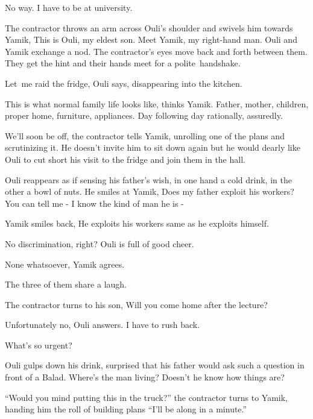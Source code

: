 \documentclass[letterpaper]{article}
\begin{document}
{\textquotedbl}No way. I have to be at university.{\textquotedbl} 

The contractor throws an arm across Ouli's shoulder and swivels him towards Yamik, {\textquotedbl}This is Ouli, my
eldest son. Meet Yamik, my right-hand man.{\textquotedbl} Ouli and Yamik exchange a nod. The contractor's eyes move
back and forth between them. They get the hint and their hands meet for a polite~handshake. 

{\textquotedbl}Let~me raid the fridge,{\textquotedbl} Ouli says, disappearing into the kitchen. 

This is what normal family life looks like, thinks Yamik. Father, mother, children, proper home, furniture, appliances.
Day following day rationally, assuredly.

{\textquotedbl}We'll soon be off,{\textquotedbl} the contractor tells Yamik, unrolling one of the plans and scrutinizing
it. He doesn't invite him to sit down again but he would dearly like Ouli to cut short his visit to the fridge and join
them in the hall.

Ouli reappears as if sensing his father's wish, in one hand a cold drink, in the other a bowl of nuts. He smiles at
Yamik, {\textquotedbl}Does my father exploit his workers? You can tell me - I know the kind of man he is
-{\textquotedbl} 

Yamik smiles back, {\textquotedbl}He exploits his workers same as he exploits himself.{\textquotedbl} 

{\textquotedbl}No discrimination, right?{\textquotedbl} Ouli is full of good cheer.

{\textquotedbl}None whatsoever,{\textquotedbl} Yamik agrees. 

The three of them share a laugh. 

The contractor turns to his son, {\textquotedbl}Will you come home after the lecture?{\textquotedbl} 

{\textquotedbl}Unfortunately no,{\textquotedbl} Ouli answers. {\textquotedbl}I have to rush back.{\textquotedbl} 

{\textquotedbl}What's so urgent?{\textquotedbl} 

Ouli gulps down his drink, surprised that his father would ask such a question in front of a Balad. Where's the man
living? Doesn't he know how things are? \ 

{}``Would you mind putting this in the truck?'' the contractor turns to Yamik, handing him the roll of building plans
``I'll be along in a minute.''
\end{document}
